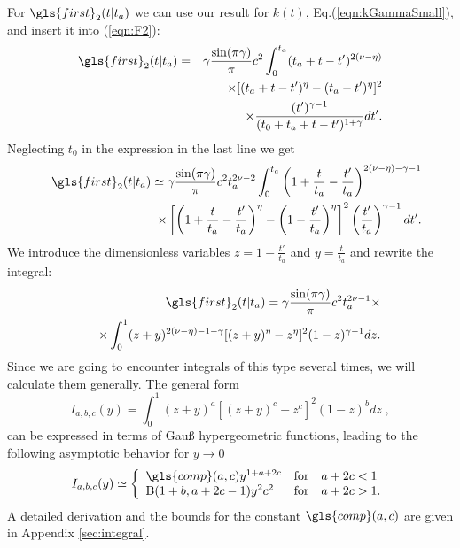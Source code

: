 For $\gls{first}_{2}(t|t_a)$ we can use our result for $k(t)$, Eq.(\ref{eqn:kGammaSmall}), and insert it into (\ref{eqn:F2}): 
\begin{eqnarray}
\gls{first}_{2}(t|t_a) &=& \gamma\frac{\sin(\pi \gamma)}{\pi}  c^2 \int^{t_a}_0 (t_a+t-t')^{2(\nu-\eta)} \nonumber \\
&& \;\; \times [(t_a+t-t')^\eta-(t_a-t')^\eta]^2  \nonumber \\
&& \;\;  \times \frac{(t')^{\gamma-1}}{(t_0+t_a+t-t')^{1+\gamma}} dt'.
\end{eqnarray}
Neglecting $t_0$ in the expression in the last line we get
\begin{eqnarray}
&& \gls{first}_{2}(t|t_a) \simeq  \gamma \frac{\sin(\pi \gamma)}{\pi}  c^2 t_a^{2\nu-2} \int^{t_a}_0 \left(1+\frac{t}{t_a}-\frac{t'}{t_a} \right)^{2(\nu-\eta)-\gamma-1} \nonumber \\
&& \;\; \times \left[ \left(1+\frac{t}{t_a}-\frac{t'}{t_a} \right)^\eta-\left(1- \frac{t'}{t_a}\right)^\eta \right]^2 \left( \frac{t'}{t_a}\right)^{\gamma-1} dt' .
\end{eqnarray}
We introduce the dimensionless variables $z = 1-\frac{t'}{t_a}$ and $y = \frac{t}{t_a}$ and rewrite the integral:
\begin{eqnarray}
&& \gls{first}_{2}(t|t_a) = \gamma \frac{\sin(\pi \gamma)}{\pi}  c^2 t_a^{2\nu-1} \times \\
&& \;\; \times \int^{1}_0 (z+y)^{2(\nu-\eta)-1-\gamma}[(z+y)^\eta-z^\eta]^2 (1-z)^{\gamma-1} dz . \nonumber
\end{eqnarray}
Since we are going to encounter integrals of this type several times, we will calculate them generally. The general form
\begin{equation}
I_{a,b,c}(y) = \int^{1}_0 (z+y)^{a}[(z+y)^c-z^c]^2 (1-z)^{b} dz \; , \label{eqn:Iabc} 
\end{equation}
can be expressed in terms of Gau{\ss} hypergeometric functions, leading to the following asymptotic behavior for $y \to 0$
\begin{equation}
I_{a,b,c}(y) \simeq \left\{ \begin{array}{l l l}
\gls{comp}(a,c) y^{1+a+2c}    & \mathrm{for} &  a+2c < 1 \\
 \mathrm{B}(1+b,a+2c-1)y^2 c^2  & \mathrm{for} & a+2c > 1.
\end{array} \right. \label{eqn:IabcAsymptotic}
\end{equation}
A detailed derivation and the bounds for the constant $\gls{comp}(a,c)$ are given in Appendix \ref{sec:integral}.


